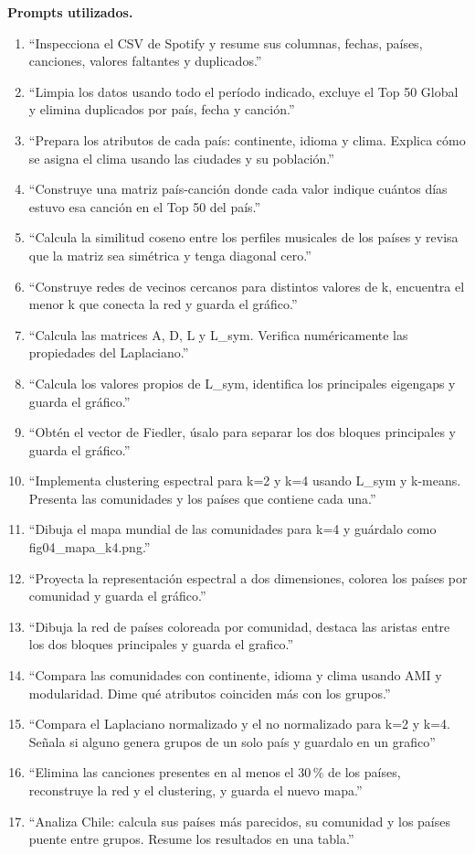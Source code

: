 \documentclass[11pt,a4paper]{article}
\begin{document}
\textbf{Prompts utilizados.}
\begin{enumerate}[leftmargin=1.5em]
\item ``Inspecciona el CSV de Spotify y resume sus columnas, fechas, países, canciones, valores faltantes y duplicados.''
\item ``Limpia los datos usando todo el período indicado, excluye el Top 50 Global y elimina duplicados por país, fecha y canción.''
\item ``Prepara los atributos de cada país: continente, idioma y clima. Explica cómo se asigna el clima usando las ciudades y su población.''
\item ``Construye una matriz país-canción donde cada valor indique cuántos días estuvo esa canción en el Top 50 del país.''
\item ``Calcula la similitud coseno entre los perfiles musicales de los países y revisa que la matriz sea simétrica y tenga diagonal cero.''
\item ``Construye redes de vecinos cercanos para distintos valores de k, encuentra el menor k que conecta la red y guarda el gráfico.''
\item ``Calcula las matrices A, D, L y L\_sym. Verifica numéricamente las propiedades del Laplaciano.''
\item ``Calcula los valores propios de L\_sym, identifica los principales eigengaps y guarda el gráfico.''
\item ``Obtén el vector de Fiedler, úsalo para separar los dos bloques principales y guarda el gráfico.''
\item ``Implementa clustering espectral para k=2 y k=4 usando L\_sym y k-means. Presenta las comunidades y los países que contiene cada una.''
\item ``Dibuja el mapa mundial de las comunidades para k=4 y guárdalo como fig04\_mapa\_k4.png.''
\item ``Proyecta la representación espectral a dos dimensiones, colorea los países por comunidad y guarda el gráfico.''
\item ``Dibuja la red de países coloreada por comunidad, destaca las aristas entre los dos bloques principales y guarda el grafico.''
\item ``Compara las comunidades con continente, idioma y clima usando AMI y modularidad. Dime qué atributos coinciden más con los grupos.''
\item ``Compara el Laplaciano normalizado y el no normalizado para k=2 y k=4. Señala si alguno genera grupos de un solo país y guardalo en un grafico''
\item ``Elimina las canciones presentes en al menos el 30\,\% de los países, reconstruye la red y el clustering, y guarda el nuevo mapa.''
\item ``Analiza Chile: calcula sus países más parecidos, su comunidad y los países puente entre grupos. Resume los resultados en una tabla.''
\end{enumerate}
\end{document}
